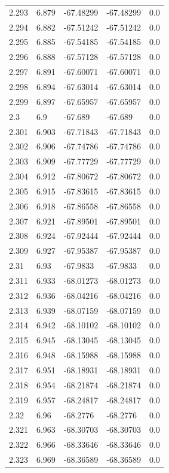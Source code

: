 \begin{tabular}{lllll}
2.293 & 6.879 & -67.48299 & -67.48299 & 0.0 \\
2.294 & 6.882 & -67.51242 & -67.51242 & 0.0 \\
2.295 & 6.885 & -67.54185 & -67.54185 & 0.0 \\
2.296 & 6.888 & -67.57128 & -67.57128 & 0.0 \\
2.297 & 6.891 & -67.60071 & -67.60071 & 0.0 \\
2.298 & 6.894 & -67.63014 & -67.63014 & 0.0 \\
2.299 & 6.897 & -67.65957 & -67.65957 & 0.0 \\
2.3 & 6.9 & -67.689 & -67.689 & 0.0 \\
2.301 & 6.903 & -67.71843 & -67.71843 & 0.0 \\
2.302 & 6.906 & -67.74786 & -67.74786 & 0.0 \\
2.303 & 6.909 & -67.77729 & -67.77729 & 0.0 \\
2.304 & 6.912 & -67.80672 & -67.80672 & 0.0 \\
2.305 & 6.915 & -67.83615 & -67.83615 & 0.0 \\
2.306 & 6.918 & -67.86558 & -67.86558 & 0.0 \\
2.307 & 6.921 & -67.89501 & -67.89501 & 0.0 \\
2.308 & 6.924 & -67.92444 & -67.92444 & 0.0 \\
2.309 & 6.927 & -67.95387 & -67.95387 & 0.0 \\
2.31 & 6.93 & -67.9833 & -67.9833 & 0.0 \\
2.311 & 6.933 & -68.01273 & -68.01273 & 0.0 \\
2.312 & 6.936 & -68.04216 & -68.04216 & 0.0 \\
2.313 & 6.939 & -68.07159 & -68.07159 & 0.0 \\
2.314 & 6.942 & -68.10102 & -68.10102 & 0.0 \\
2.315 & 6.945 & -68.13045 & -68.13045 & 0.0 \\
2.316 & 6.948 & -68.15988 & -68.15988 & 0.0 \\
2.317 & 6.951 & -68.18931 & -68.18931 & 0.0 \\
2.318 & 6.954 & -68.21874 & -68.21874 & 0.0 \\
2.319 & 6.957 & -68.24817 & -68.24817 & 0.0 \\
2.32 & 6.96 & -68.2776 & -68.2776 & 0.0 \\
2.321 & 6.963 & -68.30703 & -68.30703 & 0.0 \\
2.322 & 6.966 & -68.33646 & -68.33646 & 0.0 \\
2.323 & 6.969 & -68.36589 & -68.36589 & 0.0 \\

\end{tabular}
